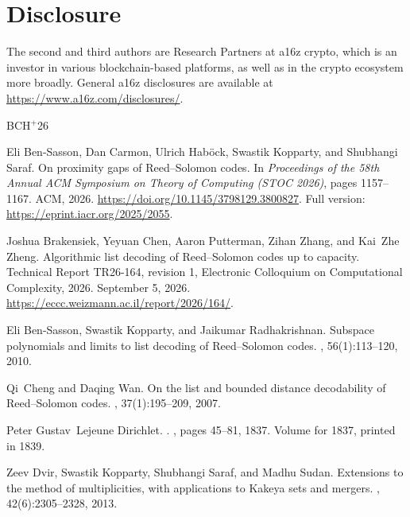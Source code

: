 \documentclass[11pt,letterpaper]{article}
\theoremstyle{definition}
\begin{document}
 \section*{Disclosure}
The second and third authors are Research Partners at a16z crypto, which is
an investor in various blockchain-based platforms, as well as in the crypto
ecosystem more broadly. General a16z disclosures are available at
\url{https://www.a16z.com/disclosures/}.
 
\newcommand{\etalchar}[1]{$^{#1}$}
\begin{thebibliography}{BCH{\etalchar{+}}26}

\bibitem[BCH{\etalchar{+}}26]{BCHKS25}
Eli {Ben-Sasson}, Dan Carmon, Ulrich Hab{\"o}ck, Swastik Kopparty, and
  Shubhangi Saraf.
\newblock On proximity gaps of {Reed--Solomon} codes.
\newblock In {\em Proceedings of the 58th Annual ACM Symposium on Theory of
  Computing (STOC 2026)}, pages 1157--1167. ACM, 2026.
\newblock \url{https://doi.org/10.1145/3798129.3800827}. Full version:
  \url{https://eprint.iacr.org/2025/2055}.

\bibitem[BCP{\etalchar{+}}26]{BCPZZ26}
Joshua Brakensiek, Yeyuan Chen, Aaron Putterman, Zihan Zhang, and Kai~Zhe
  Zheng.
\newblock Algorithmic list decoding of {Reed--Solomon} codes up to capacity.
\newblock Technical Report TR26-164, revision 1, Electronic Colloquium on
  Computational Complexity, 2026.
\newblock September 5, 2026.
  \url{https://eccc.weizmann.ac.il/report/2026/164/}.

Eli {Ben-Sasson}, Swastik Kopparty, and Jaikumar Radhakrishnan.
\newblock Subspace polynomials and limits to list decoding of {Reed--Solomon}
  codes.
, 56(1):113--120, 2010.

Qi~Cheng and Daqing Wan.
\newblock On the list and bounded distance decodability of {Reed--Solomon}
  codes.
, 37(1):195--209, 2007.

Peter Gustav~Lejeune Dirichlet.
.
, pages 45--81, 1837.
\newblock Volume for 1837, printed in 1839.

Zeev Dvir, Swastik Kopparty, Shubhangi Saraf, and Madhu Sudan.
\newblock Extensions to the method of multiplicities, with applications to
  {Kakeya} sets and mergers.
, 42(6):2305--2328, 2013.


\end{thebibliography}
\end{document}
